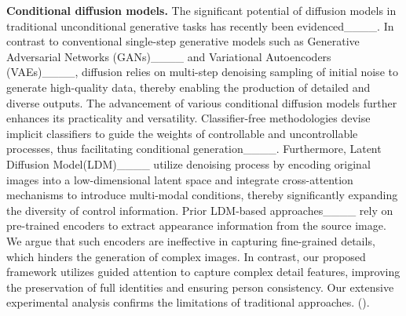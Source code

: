 \textbf{Conditional diffusion models.}
The significant potential of diffusion models in traditional unconditional generative tasks has recently been evidenced____. 
In contrast to conventional single-step generative models such as Generative Adversarial Networks (GANs)____ and Variational Autoencoders (VAEs)____, diffusion relies on multi-step denoising sampling of initial noise to generate high-quality data, thereby enabling the production of detailed and diverse outputs. The advancement of various conditional diffusion models further enhances its practicality and versatility. Classifier-free methodologies devise implicit classifiers to guide the weights of controllable and uncontrollable processes, thus facilitating conditional generation____. Furthermore, Latent Diffusion Model(LDM)____ utilize denoising process by encoding original images into a low-dimensional latent space and integrate cross-attention mechanisms to introduce multi-modal conditions, thereby significantly expanding the diversity of control information. 
Prior LDM-based approaches____ rely on pre-trained encoders to extract appearance information from the source image. 
We argue that such encoders are ineffective in capturing fine-grained details, which hinders the generation of complex images. In contrast, our proposed framework utilizes guided attention to capture complex detail features, improving the preservation of full identities and ensuring person consistency.
Our extensive experimental analysis confirms the limitations of traditional approaches. ().
